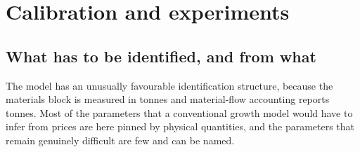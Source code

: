 \section{Calibration and experiments}\label{sec:q:cal}

\subsection{What has to be identified, and from what}\label{sec:q:cal:blocks}

The model has an unusually favourable identification structure, because the materials block is measured in tonnes and material-flow accounting reports tonnes. Most of the parameters that a conventional growth model would have to infer from prices are here pinned by physical quantities, and the parameters that remain genuinely difficult are few and can be named.

